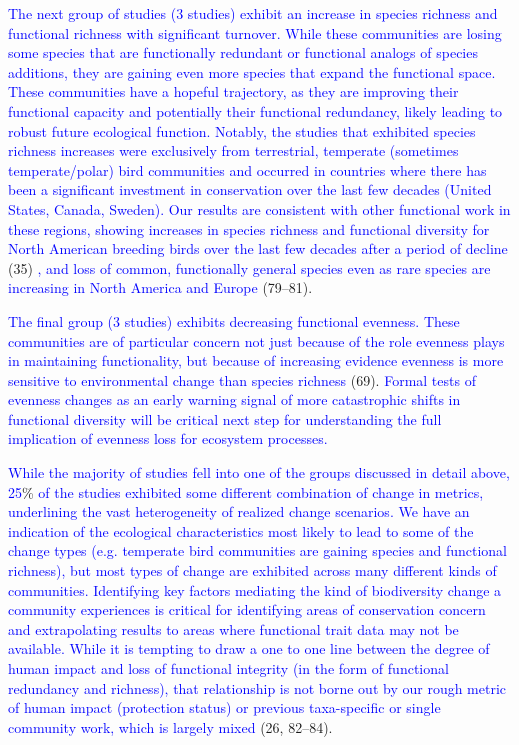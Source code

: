 \documentclass{article}
\begin{document}
\textcolor{blue}{The next group of studies (3 studies) exhibit an increase in species richness and functional richness with significant turnover. While these communities are losing some species that are functionally redundant or functional analogs of species additions, they are gaining even more species that expand the functional space. These communities have a hopeful trajectory, as they are improving their functional capacity and potentially their functional redundancy, likely leading to robust future ecological function. Notably, the studies that exhibited species richness increases were exclusively from terrestrial, temperate (sometimes temperate/polar) bird communities and occurred in countries where there has been a significant investment in conservation over the last few decades (United States, Canada, Sweden). Our results are consistent with other functional work in these regions, showing increases in species richness and functional diversity for North American breeding birds over the last few decades after a period of decline}
(35)
\textcolor{blue}{, and loss of common, functionally general species even as rare species are increasing in North America and Europe }
(79--81).

\textcolor{blue}{The final group (3 studies) exhibits decreasing functional evenness. These communities are of particular concern not just because of the role evenness plays in maintaining functionality, but because of increasing evidence evenness is more sensitive to environmental change than species richness}
(69).
\textcolor{blue}{Formal tests of evenness changes as an early warning signal of more catastrophic shifts in functional diversity will be critical next step for understanding the full implication of evenness loss for ecosystem processes.}

\textcolor{blue}{While the majority of studies fell into one of the groups discussed in detail above, 25}\%
\textcolor{blue}{of the studies exhibited some different combination of change in metrics, underlining the vast heterogeneity of realized change scenarios.}
\textcolor{blue}{We have an indication of the ecological characteristics most likely to lead to some of the change types (e.g. temperate bird communities are gaining species and functional richness), but most types of change are exhibited across many different kinds of communities. }
\textcolor{blue}{Identifying key factors mediating the kind of biodiversity change a community experiences is critical for identifying areas of conservation concern and extrapolating results to areas where functional trait data may not be available. While it is tempting to draw a one to one line between the degree of human impact and loss of functional integrity (in the form of functional redundancy and richness), that relationship is not borne out by our rough metric of human impact (protection status) or previous taxa-specific or single community work, which is largely mixed}
(26, 82--84).
\end{document}
